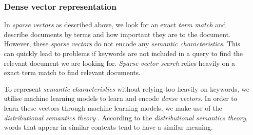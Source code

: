 \documentclass{article}
\begin{document}
\subsubsection*{Dense vector representation}
In \textit{sparse vectors} as described above, we look for an exact \textit{term match} and describe documents by terms and how important they are to the document. However, these \textit{sparse vectors} do not encode any \textit{semantic characteristics}. This can quickly lead to problems if keywords are not included in a query to find the relevant document we are looking for. \textit{Sparse vector search} relies heavily on a exact term match to find relevant documents.

To represent \textit{semantic characteristics} without relying too heavily on keywords, we utilise machine learning models to learn and encode \textit{dense vectors}. In order to learn these vectors through machine learning models, we make use of the \textit{distributional semantics theory} \cite{distributionalSemanticsTheory}.
According to the \textit{distributional semantics theory}, words that appear in similar contexts tend to have a similar meaning.
\end{document}
